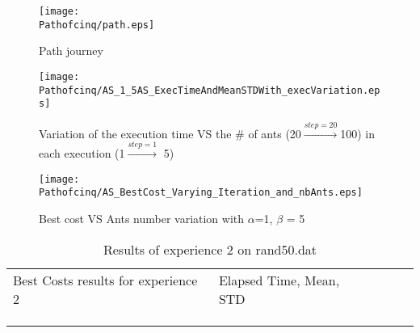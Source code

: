 \begin{figure}[H]
		\begin{minipage}[t]{0.45\linewidth}
		\centering
		\texttt{[image: \\Pathofcinq/path.eps]}
		\caption{Path journey}\label{fig:Pathofcinq:path}
		
		\end{minipage}\hfill
		\begin{minipage}[t]{0.45\linewidth}
		\centering
		\texttt{[image: \\Pathofcinq/AS\_1\_5AS\_ExecTimeAndMeanSTDWith\_execVariation.eps]}
		\caption{Variation of the execution time VS the \# of ants (20$\stackrel{step=20}{\rightarrow}$100) in each execution (1$\stackrel{step=1}{\rightarrow}$ 5)}
		\label{fig:Pathofcinq:AS_1_5AS_ExecTimeAndMeanSTDWith_execVariation}
		\end{minipage}
	\flushleft
		\begin{minipage}[t]{0.45\linewidth}
		\centering
		\texttt{[image: \\Pathofcinq/AS\_BestCost\_Varying\_Iteration\_and\_nbAnts.eps]}
		\caption{Best cost VS Ants number variation with $\alpha$=1, $ \beta $ = 5}
		\label{fig:Pathofcinq:AS_BestCost_Varying_Iteration_and_nbAnts}
		\end{minipage}
\end{figure}
		\begin{minipage}[t]{0.9\linewidth}
		\vspace{-9mm}
		\begin{table}[H]
		\label{tab:Pathofcinq:expdeux}
		\begin{tabular}{lllll}
		\cline{1-2}
		\multicolumn{1}{|l|}{Best Costs results for experience 2}                                                           &  \multicolumn{1}{l|}{Elapsed Time, Mean, STD}                                             &  &  &  \\ \cline{1-2}
		\multicolumn{1}{|l|}{} & \multicolumn{1}{l|}{ } &  &  &  \\ \cline{1-2}
																						  &                                                                     &  &  &  \\
																						  &                                                                     &  &  & 
		\end{tabular}
		\caption{Results of experience 2 on rand50.dat}
		\end{table}
		\end{minipage}